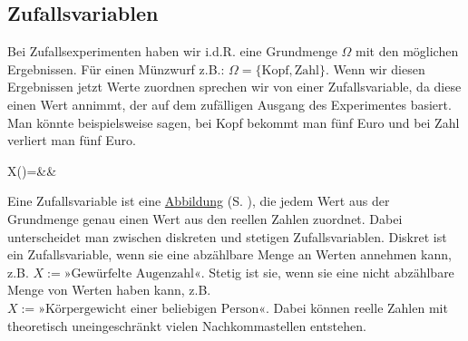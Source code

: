 \documentclass[12pt]{article}
\newcommand{\highlight}[2]{\textcolor{blue}{\hyperref[#1]{#2}} (S. \pageref{#1})}
\begin{document}
		\subsection{Zufallsvariablen}
			Bei Zufallsexperimenten haben wir i.d.R. eine Grundmenge $\Omega$ mit den möglichen Ergebnissen. Für einen Münzwurf z.B.: $\Omega=\{\text{Kopf},\text{Zahl}\}$. Wenn wir diesen Ergebnissen jetzt Werte zuordnen sprechen wir von einer Zufallsvariable, da diese einen Wert annimmt, der auf dem zufälligen Ausgang des Experimentes basiert. Man könnte beispielsweise sagen, bei Kopf bekommt man fünf Euro und bei Zahl verliert man fünf Euro.
			\begin{flalign*}
				X(\omega)=&&
			\end{flalign*}
			Eine Zufallsvariable ist eine \highlight{subsec:abbildungen}{Abbildung}, die jedem Wert aus der Grundmenge genau einen Wert aus den reellen Zahlen zuordnet. Dabei unterscheidet man zwischen diskreten und stetigen Zufallsvariablen. Diskret ist ein Zufallsvariable, wenn sie eine abzählbare Menge an Werten annehmen kann, z.B. $X:=\text{»Gewürfelte Augenzahl«}$. Stetig ist sie, wenn sie eine nicht abzählbare Menge von Werten haben kann, z.B. $X:=\text{»Körpergewicht einer beliebigen Person«}$. Dabei können reelle Zahlen mit theoretisch uneingeschränkt vielen Nachkommastellen entstehen.
\end{document}
